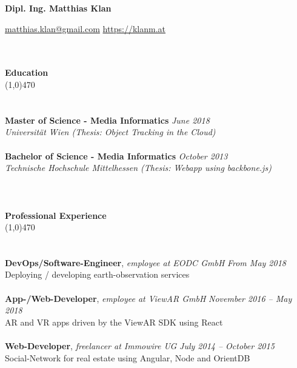 \documentclass[10pt]{article} %
\begin{document}
\centerline{{\LARGE \bf Dipl. Ing. Matthias Klan}}
\centerline{\href{mailto:matthias.klan@gmail.com}{matthias.klan@gmail.com} \raisebox{0.25ex}{\tiny$\bullet$} \href{https://klanm.at}{https://klanm.at}}

\noindent %
\\\\
{\Large \bf Education}\\
\line(1,0){470}\\
\\\\
\noindent
{\bf Master of Science - Media Informatics} \hfill \textit{June 2018} \\ 
\textit{Universität Wien (Thesis: Object Tracking in the Cloud)}\\\\
\noindent
{\bf Bachelor of Science - Media Informatics} \hfill \textit{October 2013} \\
\textit{Technische Hochschule Mittelhessen (Thesis: Webapp using backbone.js)}\\
\\
\noindent %
\\\\
{\Large \bf Professional Experience}\\
\line(1,0){470}\\
\\\\
\noindent
{\bf DevOps/Software-Engineer}, \textit{employee at EODC GmbH}  \hfill \textit{ From May 2018 } \\ 
Deploying / developing earth-observation services\\\\
\noindent
\noindent
{\bf App-/Web-Developer}, \textit{employee at ViewAR GmbH}  \hfill \textit{ November 2016 -- May 2018 } \\ 
AR and VR apps driven by the ViewAR SDK using React\\\\
\noindent
{\bf Web-Developer}, \textit{freelancer at Immowire UG}  \hfill \textit{ July 2014 -- October 2015 } \\ 
Social-Network for real estate using Angular, Node and OrientDB\\\\
\end{document}
